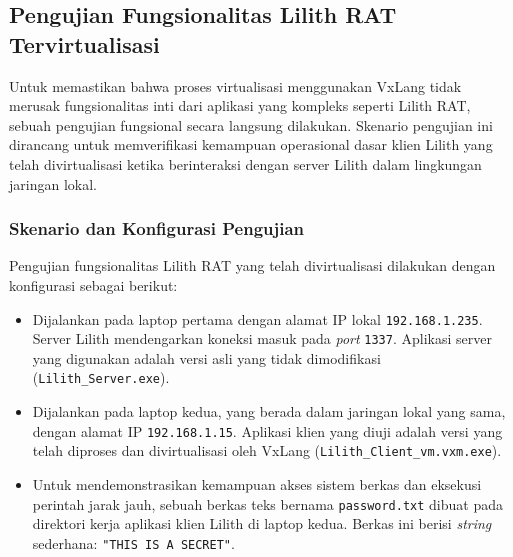 \subsection{Pengujian Fungsionalitas Lilith RAT Tervirtualisasi}
\label{subsec:fungsionalitas_lilith_virtualized}

Untuk memastikan bahwa proses virtualisasi menggunakan VxLang tidak merusak fungsionalitas inti dari aplikasi yang kompleks seperti Lilith RAT, sebuah pengujian fungsional secara langsung dilakukan. Skenario pengujian ini dirancang untuk memverifikasi kemampuan operasional dasar klien Lilith yang telah divirtualisasi ketika berinteraksi dengan server Lilith dalam lingkungan jaringan lokal.

\subsubsection{Skenario dan Konfigurasi Pengujian}
Pengujian fungsionalitas Lilith RAT yang telah divirtualisasi dilakukan dengan konfigurasi sebagai berikut:
\begin{itemize}
    \item {} Dijalankan pada laptop pertama dengan alamat IP lokal \texttt{192.168.1.235}. Server Lilith mendengarkan koneksi masuk pada \textit{port} \texttt{1337}. Aplikasi server yang digunakan adalah versi asli yang tidak dimodifikasi (\texttt{Lilith\_Server.exe}).
    \item {} Dijalankan pada laptop kedua, yang berada dalam jaringan lokal yang sama, dengan alamat IP \texttt{192.168.1.15}. Aplikasi klien yang diuji adalah versi yang telah diproses dan divirtualisasi oleh VxLang (\texttt{Lilith\_Client\_vm.vxm.exe}).
    \item {} Untuk mendemonstrasikan kemampuan akses sistem berkas dan eksekusi perintah jarak jauh, sebuah berkas teks bernama \texttt{password.txt} dibuat pada direktori kerja aplikasi klien Lilith di laptop kedua. Berkas ini berisi \textit{string} sederhana: \texttt{"THIS IS A SECRET"}.
\end{itemize}

